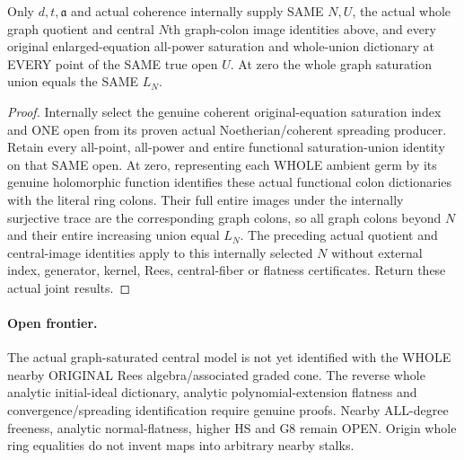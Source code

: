 \begin{theorem}
\label{hir:relative-normal-analytic-graph-original-saturated-consumer}
\leanok
{}
Only $d,t,\mathfrak a$ and actual coherence internally supply SAME $N,U$,
the actual whole graph quotient and central $N$th graph-colon image
identities above, and every original enlarged-equation all-power saturation
and whole-union dictionary at EVERY point of the SAME true open $U$.
At zero the whole graph saturation union equals the SAME $L_N$.
\end{theorem}
\begin{proof}
Internally select the genuine coherent original-equation saturation index
and ONE open from its proven actual Noetherian/coherent spreading producer.
Retain every all-point, all-power and entire functional saturation-union
identity on that SAME open. At zero, representing each WHOLE ambient germ
by its genuine holomorphic function identifies these actual functional
colon dictionaries with the literal ring colons. Their full entire images
under the internally surjective trace are the corresponding graph colons,
so all graph colons beyond $N$ and their entire increasing union equal $L_N$.
The preceding actual quotient and central-image identities apply to this
internally selected $N$ without external index, generator, kernel, Rees,
central-fiber or flatness certificates. Return these actual joint results.
\end{proof}

\paragraph{Open frontier.}
The actual graph-saturated central model is not yet identified with the
WHOLE nearby ORIGINAL Rees algebra/associated graded cone. The reverse
whole analytic initial-ideal dictionary, analytic polynomial-extension
flatness and convergence/spreading identification require genuine proofs.
Nearby ALL-degree freeness, analytic normal-flatness, higher HS and G8 remain
OPEN. Origin whole ring equalities do not invent maps into arbitrary nearby stalks.
